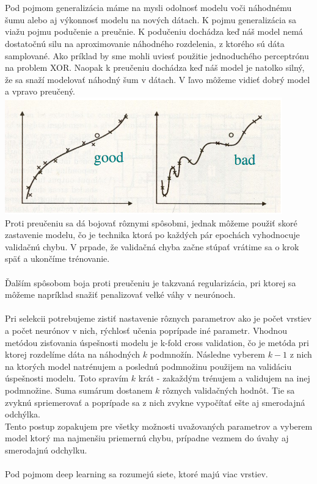 \documentclass{article}
\numberwithin{equation}{section} %
\begin{document}
\\\\
Pod pojmom generalizácia máme na mysli odolnosť modelu voči náhodnému šumu alebo aj výkonnosť modelu na nových dátach. K pojmu generalizácia sa viažu pojmu podučenie a preučnie. K podučeniu dochádza keď náš model nemá dostatočnú silu na aproximovanie náhodného rozdelenia, z ktorého sú dáta samplované. Ako príklad by sme mohli uviesť použitie jednoduchého perceptrónu na problem XOR. Naopak k preučeniu dochádza keď náš model je natolko silný, že sa snaží modelovať náhodný šum v dátach. V ľavo môžeme vidieť dobrý model a vpravo preučený.\\
\includegraphics[width=12cm]{imgs/bias_var}\\
Proti preučeniu sa dá bojovať rôznymi spôsobmi, jednak môžeme použiť skoré zastavenie modelu, čo je technika ktorá po každých pár epochách vyhodnocuje validačnú chybu. V prpade, že validačná chyba začne stúpať vrátime sa o krok späť a ukončíme trénovanie.
\\\\
Ďalším spôsobom boja proti preučeniu je takzvaná regularizácia, pri ktorej sa môžeme napríklad snažiť penalizovať velké váhy v neurónoch.
\\\\
Pri selekcii potrebujeme zistiť nastavenie rôznych parametrov ako je počet vrstiev a počet neurónov v nich, rýchlosť učenia poprípade iné parametr. Vhodnou metódou zisťovania úspešnosti modelu je k-fold cross validation, čo je metóda pri ktorej rozdelíme dáta na náhodných $k$ podmnožín. Následne vyberem $k-1$ z nich na ktorých model natrénujem a poslednú podmnožinu použijem na validáciu úspešnosti modelu. Toto spravím $k$ krát - zakaždým trénujem a validujem na inej podmnožine. Suma sumárum dostanem $k$ rôznych validačných hodnôt. Tie sa zvyknú spriemerovať a poprípade sa z nich zvykne vypočítať ešte aj smerodajná odchýlka. 
\\
Tento postup zopakujem pre všetky možnosti uvažovaných parametrov a vyberem model ktorý ma najmenšiu priemernú chybu, prípadne vezmem do úvahy aj smerodajnú odchylku.
\\\\
Pod pojmom deep learning sa rozumejú siete, ktoré majú viac vrstiev.
\end{document}
